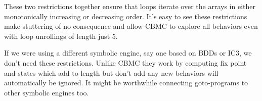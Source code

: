 These two restrictions together ensure that loops iterate over the
arrays in either monotonically increasing or decreasing order. It’s
easy to see these restrictions make stuttering of no consequence and
allow CBMC to explore all behaviors even with loop unrollings of
length just 5.

\begin{remark}
If we were using a different symbolic engine, say one based on
BDDs or IC3, we don’t need these restrictions. Unlike CBMC
they work by computing fix point and states which add to length but
don’t add any new behaviors will automatically be ignored.  It might
be worthwhile connecting goto-programs to other symbolic engines too.
\end{remark}


